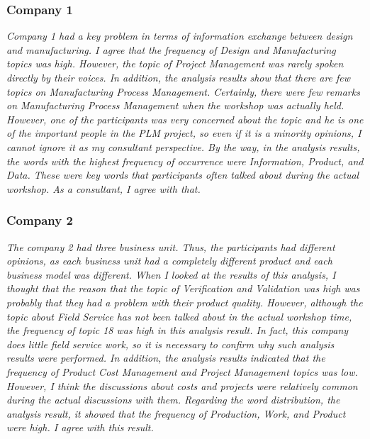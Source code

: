 \documentclass[10pt, conference, compsocconf]{IEEEtran}
\begin{document}
\subsubsection{Company 1}
{\it Company 1 had a key problem in terms of information exchange between design and manufacturing. I agree that the frequency of Design and Manufacturing topics was high. However, the topic of Project Management was rarely spoken directly by their voices. In addition, the analysis results show that there are few topics on Manufacturing Process Management. Certainly, there were few remarks on Manufacturing Process Management when the workshop was actually held. However, one of the participants was very concerned about the topic and he is one of the important people in the PLM project, so even if it is a minority opinions, I cannot ignore it as my consultant perspective. By the way, in the analysis results, the words with the highest frequency of occurrence were Information, Product, and Data. These were key words that participants often talked about during the actual workshop. As a consultant, I agree with that.}

\subsubsection{Company 2}
{\it The company 2 had three business unit. Thus, the participants had different opinions, as each business unit had a completely different product and each business model was different. When I looked at the results of this analysis, I thought that the reason that the topic of Verification and Validation was high was probably that they had a problem with their product quality. However, although the topic about Field Service has not been talked about in the actual workshop time, the frequency of topic 18 was high in this analysis result. In fact, this company does little field service work, so it is necessary to confirm why such analysis results were performed. In addition, the analysis results indicated that the frequency of Product Cost Management and Project Management topics was low. However, I think the discussions about costs and projects were relatively common during the actual discussions with them. Regarding the word distribution, the analysis result, it showed that the frequency of Production, Work, and Product were high. I agree with this result.}
\end{document}
